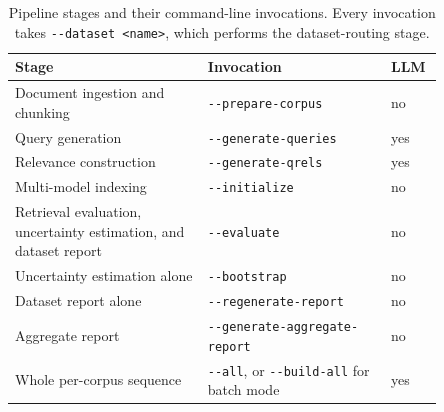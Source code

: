 \begin{table}[htbp]
\caption{Pipeline stages and their command-line invocations. Every invocation takes \texttt{-{}-dataset <name>}, which performs the dataset-routing stage.}\label{tbl:method_invocations}
\centering
\small
\begin{tabular}{@{}>{\raggedright\arraybackslash}p{0.40\linewidth}>{\raggedright\arraybackslash}p{0.38\linewidth}>{\raggedright\arraybackslash}p{0.07\linewidth}@{}}
\toprule
Stage & Invocation & LLM \\
\midrule
Document ingestion and chunking & \texttt{-{}-prepare-corpus} & no \\
Query generation & \texttt{-{}-generate-queries} & yes \\
Relevance construction & \texttt{-{}-generate-qrels} & yes \\
Multi-model indexing & \texttt{-{}-initialize} & no \\
Retrieval evaluation, uncertainty estimation, and dataset report & \texttt{-{}-evaluate} & no \\
Uncertainty estimation alone & \texttt{-{}-bootstrap} & no \\
Dataset report alone & \texttt{-{}-regenerate-report} & no \\
Aggregate report & \texttt{-{}-generate-aggregate-report} & no \\
Whole per-corpus sequence & \texttt{-{}-all}, or \texttt{-{}-build-all} for batch mode & yes \\
\bottomrule
\end{tabular}
\end{table}
